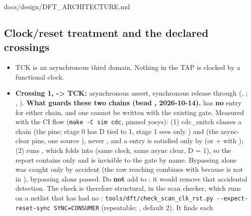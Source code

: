 \begin{relocated}{docs/design/DFT_ARCHITECTURE.md}
\subsection{\texorpdfstring{Clock/\allowbreak{}reset treatment and
the declared
crossings}{Clock/reset treatment and the declared crossings}}\label{tm:ch:dft-architecture:155-clockreset-treatment-and-the-declared-crossings}

\begin{itemize}
\tightlist
\item
  TCK is an asynchronous third domain. Nothing in the TAP is clocked by
  a functional clock.
\item
  \textbf{Crossing 1,  -\textgreater{} TCK:} asynchronous
  assert, synchronous release through 
  (, ; ,
  ). \textbf{What guards these two chains (bead
  , 2026-10-14).}  has
  \textbf{no}  entry for either chain, and
  one cannot be written with the existing gate. Measured with the CI
  flow (\texttt{make\ -\allowbreak{}C\ sim\ cdc}, pinned yosys): (1)
  cdc\_\allowbreak{}snitch classes a  chain
   (the  pins; stage 0 has D tied to 1, stage 1 sees
  only ) and  (the  async-clear pins, one
  source ), never , and a
   entry is satisfied only by 
  (or + with ); (2)
   runs , which folds
   into  (same clock, same async
  clear, D = 1), so the report contains only
   and  is invisible
  to the gate by name. Bypassing  alone was caught only
  by accident (the raw  reaching  combines
  with  because  is not in
  ), bypassing  alone passed. Do
  \textbf{not} add  to : it would
  remove that accidental detection. The check is therefore structural,
  in the scan checker, which runs on a netlist that has had no
  :
  \texttt{tools/\allowbreak{}dft/\allowbreak{}check\_\allowbreak{}scan\_\allowbreak{}clk\_\allowbreak{}rst.\allowbreak{}py\ -\allowbreak{}-\allowbreak{}expect-\allowbreak{}reset-\allowbreak{}sync\ SYNC=\allowbreak{}CONSUMER}
  (repeatable; , default 2). It finds each

\end{itemize}
\end{relocated}
